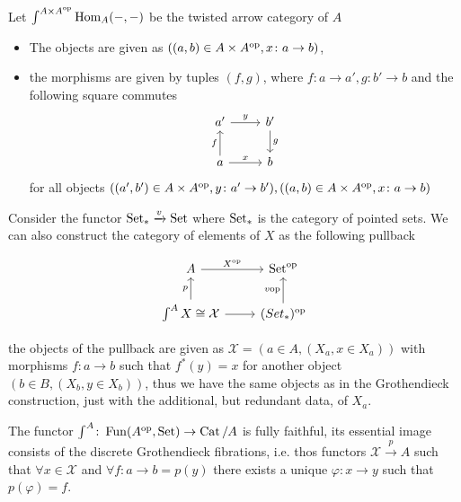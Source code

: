 \begin{exmp}	
	Let $ \int^{ A \times A^{ \operatorname{op} }} \operatorname{Hom}_A ( - , - ) $ be the twisted arrow category of $ A $
	\begin{itemize}
		\item 
		The objects are given as $ ( ( a , b ) \in  A \times A^{\operatorname{op}}, x \colon a \to b ) $,
		
		\item 
		the morphisms are given by tuples $ ( f , g ) $, where $ f \colon a \to a' , g \colon b' \to b $ and the following square commutes
		\[
		\begin{tikzcd}	
			a'
			\ar[r, " y " ]
			&
			b'
			\ar[d, " g "]
			\\
			a 
			\ar[ u , " f" ]
			\ar[r, " x" ]
			&
			b
		\end{tikzcd}
		\]
		for all objects $ ( ( a' , b' ) \in A \times A^{ \operatorname{op} } , y \colon a' \to b' ), ((a,b) \in A \times A^{ \operatorname{op} }, x \colon a \to b )$
	\end{itemize}

	Consider the functor $ \operatorname{Set}_* \xrightarrow{v} \operatorname{Set}$ where $ \operatorname{Set}_*$ is the category of pointed sets.
	We can also construct the category of elements of $ X $ as the following pullback
	
	\[
	\begin{tikzcd}
		A
		\ar[r, " X^{ \op } "]
		&
		\Set^{ \op }
		\\
		\int^A X \cong \mathcal{X}
		\ar[u , " p "]
		\ar[r]
		&
		(Set_*)^{\op}
		\ar[u, "v{\op}"]
	\end{tikzcd}
	\]
	
	the objects of the pullback are given as $ \mathcal{ X } = ( a \in A , ( X_a, x \in X_a )) $
	with morphisms $ f\colon a \to b $ such that $ f^* ( y ) = x $ for another object $ ( b \in B , ( X_b , y \in X_b ))$, thus we have the same objects as in the Grothendieck construction, just with the additional, but redundant data, of $ X_a $.

	
\end{exmp}


\begin{thm}
	The functor $ \int^A \colon \operatorname{Fun} ( A^{ \operatorname{op} } , \operatorname{Set} ) \to \operatorname{Cat}/A $ is fully faithful,
	its essential image consists of the discrete Grothendieck fibrations, i.e. thos functors 
	$ \mathcal{ X } \xrightarrow{ p } A $ such that $ \forall x \in \mathcal{X} $ and $ \forall f \colon a \to b = p ( y) $ there exists a unique $ \varphi \colon x \to y  $ such that $ p( \varphi ) = f $.
\end{thm} 


